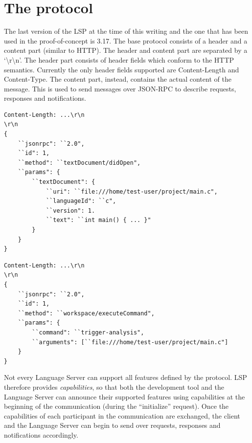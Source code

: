 \section{The protocol}\label{sec:cap_sec_subsec}
The last version of the LSP at the time of this writing and the one that has been used in the proof-of-concept is 3.17.
The base protocol consists of a header and a content part (similar to HTTP). The header and content part are separated by a `\textbackslash r\textbackslash n'.
The header part consists of header fields which conform to the HTTP semantics. Currently the only header fields supported are Content-Length	 and Content-Type.
The content part, instead, contains the actual content of the message. This is used to send messages over JSON-RPC to describe requests, responses and notifications.

\begin{lstlisting}[caption={textDocument/didOpen notification example}, label={lst:block_struct}]
Content-Length: ...\r\n
\r\n
{
	``jsonrpc": ``2.0",
	``id": 1,
	``method": ``textDocument/didOpen",
	``params": {
		``textDocument": {
			``uri": ``file:///home/test-user/project/main.c",
			``languageId": ``c",
			``version": 1.
			``text": ``int main() { ... }"
		}
	}
}
\end{lstlisting}

\begin{lstlisting}[caption={workspace/executeCommand request example}, label={lst:block_struct}]
Content-Length: ...\r\n
\r\n
{
	``jsonrpc": ``2.0",
	``id": 1,
	``method": ``workspace/executeCommand",
	``params": {
		``command": ``trigger-analysis",
		``arguments": [``file:///home/test-user/project/main.c"]
	}
}
\end{lstlisting}

Not every Language Server can support all features defined by the protocol. LSP therefore provides \emph{capabilities}, so that both  the development tool and the Language Server can announce their supported features using capabilities at the beginning of the communication (during the ``initialize'' request). Once the capabilities of each participant in the communication are exchanged, the client and the Language Server can begin to send over requests, responses and notifications accordingly.

